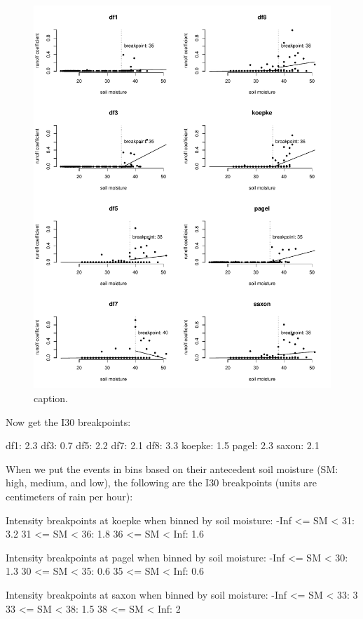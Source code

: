 \documentclass[12pt]{article}
\begin{document}
\begin{figure}
    \begin{center}
\includegraphics{runoff-sm}
    \end{center}
    \caption{caption.\label{sm}}
\end{figure}


Now get the I30 breakpoints:\\

\begin{Schunk}
\begin{Soutput}
df1: 2.3
df3: 0.7
df5: 2.2
df7: 2.1
df8: 3.3
koepke: 1.5
pagel: 2.3
saxon: 2.1
\end{Soutput}
\end{Schunk}


When we put the events in bins based on their antecedent soil moisture (SM: high, medium, and low), the following are the I30 breakpoints (units are centimeters of rain per hour):\\

\begin{Schunk}
\begin{Soutput}
Intensity breakpoints at koepke when binned by soil moisture:
-Inf <= SM < 31: 3.2
31 <= SM < 36: 1.8
36 <= SM < Inf: 1.6

Intensity breakpoints at pagel when binned by soil moisture:
-Inf <= SM < 30: 1.3
30 <= SM < 35: 0.6
35 <= SM < Inf: 0.6

Intensity breakpoints at saxon when binned by soil moisture:
-Inf <= SM < 33: 3
33 <= SM < 38: 1.5
38 <= SM < Inf: 2
\end{Soutput}
\end{Schunk}
\end{document}
